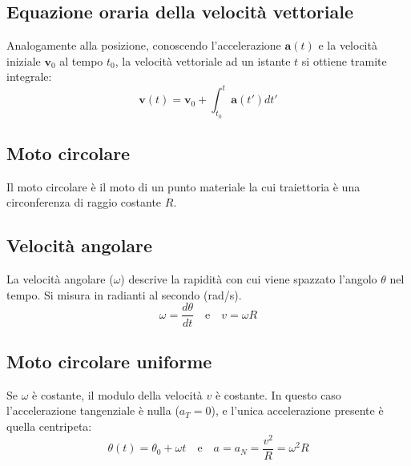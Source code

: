 \documentclass[12pt]{article}
\begin{document}
\subsection*{Equazione oraria della velocità vettoriale}
Analogamente alla posizione, conoscendo l'accelerazione $\mathbf{a}(t)$ e la velocità iniziale $\mathbf{v}_0$ al tempo $t_0$, la velocità vettoriale ad un istante $t$ si ottiene tramite integrale:
\begin{equation}
\mathbf{v}(t) = \mathbf{v}_0 + \int_{t_0}^{t} \mathbf{a}(t') dt'
\end{equation}

\subsection*{Moto circolare}
Il moto circolare è il moto di un punto materiale la cui traiettoria è una circonferenza di raggio costante $R$.

\vspace{0.3cm}
\begin{center}
\end{center}
\vspace{0.3cm}

\subsection*{Velocità angolare}
La velocità angolare ($\omega$) descrive la rapidità con cui viene spazzato l'angolo $\theta$ nel tempo. Si misura in radianti al secondo (rad/s).
\begin{equation}
\omega = \frac{d\theta}{dt} \quad \text{e} \quad v = \omega R
\end{equation}

\subsection*{Moto circolare uniforme}
Se $\omega$ è costante, il modulo della velocità $v$ è costante. In questo caso l'accelerazione tangenziale è nulla ($a_T = 0$), e l'unica accelerazione presente è quella centripeta:
\begin{equation}
\theta(t) = \theta_0 + \omega t \quad \text{e} \quad a = a_N = \frac{v^2}{R} = \omega^2 R
\end{equation}
\end{document}
